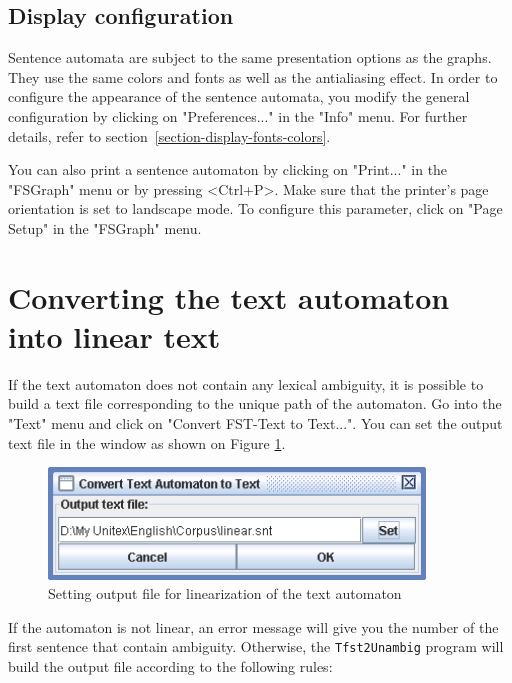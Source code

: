 \bigskip
\noindent 
\subsection{Display configuration}
Sentence automata are subject to the same presentation options as the
graphs. They use the same colors and fonts as well as the antialiasing effect. In
order to configure the appearance of the sentence automata, you  modify
the general configuration by clicking on "Preferences..." in the "Info" menu.
For further details, refer to section~\ref{section-display-fonts-colors}.

\bigskip
\noindent You can also print a sentence automaton by clicking on "Print..." in
the "FSGraph" menu or by pressing  <Ctrl+P>. Make sure that the printer's page
orientation is set to landscape mode.  To
configure this parameter, click on "Page Setup" in the
"FSGraph" menu.

\section{Converting the text automaton into linear text}
\label{section-linear-text}
If the text automaton does not contain any lexical ambiguity, it is possible to
build a text file corresponding to the unique path of the automaton. Go into the
"Text" menu and click on "Convert FST-Text to Text...". You can set the output
text file in the window as shown on Figure
\ref{fig-linearization-configuration}.

\begin{figure}[!ht]
\begin{center}
\includegraphics[width=10cm]{resources/img/fig7-25.png}
\caption{Setting output file for linearization of the text automaton\label{fig-linearization-configuration}}
\end{center}
\end{figure}

\bigskip
\noindent If the automaton is not linear, an error message will give you the number of
the first sentence that contain ambiguity. Otherwise, the \verb+Tfst2Unambig+ program
will build the output file according to the following rules:

